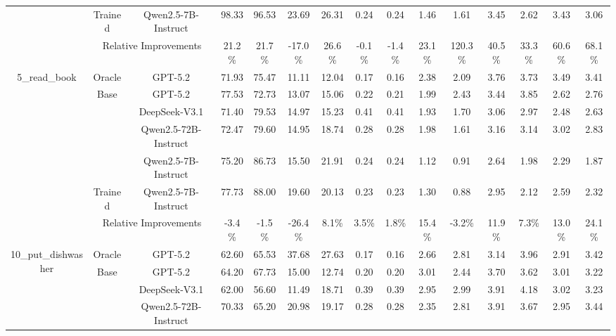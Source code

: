 \documentclass{article}
\theoremstyle{plain}
\theoremstyle{definition}
\theoremstyle{remark}
\begin{document}
\begin{table}[htbp]
{\begin{tabular}{c|c|r|cccccc|cccccc}
  \cmidrule{2-15}          & Trained & \multicolumn{1}{c|}{Qwen2.5-7B-Instruct} & 98.33  & 96.53  & 23.69  & 26.31  & 0.24  & 0.24  & 1.46  & 1.61  & 3.45  & 2.62  & 3.43  & 3.06  \\
  \cmidrule{2-15}          & \multicolumn{2}{c|}{Relative Improvements} & 21.2\% & 21.7\% & -17.0\% & 26.6\% & -0.1\% & -1.4\% & 23.1\% & 120.3\% & 40.5\% & 33.3\% & 60.6\% & 68.1\% \\
      \midrule
      \multirow{7}[8]{*}{5\_read\_book} & Oracle & \multicolumn{1}{c|}{GPT-5.2} & 71.93 & 75.47 & 11.11 & 12.04 & 0.17 & 0.16 & 2.38 & 2.09 & 3.76 & 3.73 & 3.49 & 3.41  \\
\cmidrule{2-15} & \multirow{4}[2]{*}{Base} & \multicolumn{1}{c|}{GPT-5.2} & 77.53 & 72.73 & 13.07 & 15.06 & 0.22 & 0.21 & 1.99 & 2.43 & 3.44 & 3.85 & 2.62 & 2.76  \\
            &       & \multicolumn{1}{c|}{DeepSeek-V3.1} & 71.40  & 79.53  & 14.97  & 15.23  & 0.41  & 0.41  & 1.93  & 1.70  & 3.06  & 2.97  & 2.48  & 2.63  \\
            &       & \multicolumn{1}{c|}{Qwen2.5-72B-Instruct} & 72.47  & 79.60  & 14.95  & 18.74  & 0.28  & 0.28  & 1.98  & 1.61  & 3.16  & 3.14  & 3.02  & 2.83  \\
            &       & \multicolumn{1}{c|}{Qwen2.5-7B-Instruct} & 75.20  & 86.73  & 15.50  & 21.91  & 0.24  & 0.24  & 1.12  & 0.91  & 2.64  & 1.98  & 2.29  & 1.87  \\
  \cmidrule{2-15}          & Trained & \multicolumn{1}{c|}{Qwen2.5-7B-Instruct} & 77.73  & 88.00  & 19.60  & 20.13  & 0.23  & 0.23  & 1.30  & 0.88  & 2.95  & 2.12  & 2.59  & 2.32  \\
  \cmidrule{2-15}          & \multicolumn{2}{c|}{Relative Improvements} & -3.4\% & -1.5\% & -26.4\% & 8.1\% & 3.5\% & 1.8\% & 15.4\% & -3.2\% & 11.9\% & 7.3\% & 13.0\% & 24.1\% \\
      \midrule
      \multirow{7}[8]{*}{10\_put\_dishwasher} & Oracle & \multicolumn{1}{c|}{GPT-5.2} & 62.60 & 65.53 & 37.68 & 27.63 & 0.17 & 0.16 & 2.66 & 2.81 & 3.14 & 3.96 & 2.91 & 3.42  \\
\cmidrule{2-15} & \multirow{4}[2]{*}{Base} & \multicolumn{1}{c|}{GPT-5.2} & 64.20 & 67.73 & 15.00 & 12.74 & 0.20 & 0.20 & 3.01 & 2.44 & 3.70 & 3.62 & 3.01 & 3.22  \\
            &       & \multicolumn{1}{c|}{DeepSeek-V3.1} & 62.00  & 56.60  & 11.49  & 18.71  & 0.39  & 0.39  & 2.95  & 2.99  & 3.91  & 4.18  & 3.02  & 3.23  \\
            &       & \multicolumn{1}{c|}{Qwen2.5-72B-Instruct} & 70.33  & 65.20  & 20.98  & 19.17  & 0.28  & 0.28  & 2.35  & 2.81  & 3.91  & 3.67  & 2.95  & 3.44  \\

\end{tabular}}
\end{table}
\end{document}
